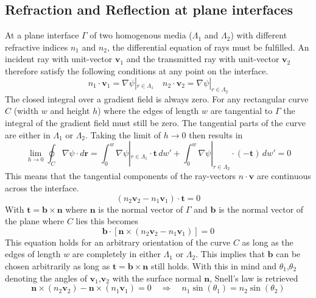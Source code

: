 \subsection{Refraction and Reflection at plane interfaces}
At a plane interface \(\Gamma \) of two homogenous media (\(\Lambda_1\) and \(\Lambda_2\)) with different refractive indices \(n_1\) and \(n_2\), the differential equation of rays must be fulfilled.
An incident ray with unit-vector \(\mathbf{v}_1\) and the transmitted ray with unit-vector \(\mathbf{v}_2\) therefore satisfy the following conditions at any point on the interface.
\begin{equation}
    n_1 \cdot \mathbf{v}_1 = \nabla \psi|_{r \in \Lambda_1 } \quad n_2 \cdot \mathbf{v}_2 = \nabla \psi|_{r \in \Lambda_2 } 
\end{equation}
The closed integral over a gradient field is always zero.
For any rectangular curve \(C\) (width \(w\) and height \(h\)) where the edges of length \(w\) are tangential to \(\Gamma \) the integral of the gradient field must still be zero.
The tangential parts of the curve are either in \(\Lambda_1\) or \(\Lambda_2\).
Taking the limit of \(h \to 0\) then results in~\parencite{born_foundations_1999}
\begin{equation}
    \lim_{h \to 0} \oint_C \nabla \psi \cdot d\mathbf{r} = \int_{0}^{w} \nabla \psi|_{r \in \Lambda_1 } \cdot \mathbf{t} \, dw' + \int_{0}^{w} \nabla \psi|_{r \in \Lambda_2 } \cdot (-\mathbf{t}) \, dw' = 0
\end{equation}
This means that the tangential components of the ray-vectors \(n \cdot \mathbf{v}\) are continuous across the interface.
\begin{equation}
    (n_2 \mathbf{v}_2 - n_1 \mathbf{v}_1) \cdot \mathbf{t} = 0
\end{equation}
With \(\mathbf{t} = \mathbf{b} \times \mathbf{n}\) where \(\mathbf{n}\) is the normal vector of \(\Gamma \) and \(\mathbf{b}\) is the normal vector of the plane where \(C\) lies this becomes
\begin{equation}
    \mathbf{b} \cdot [\mathbf{n} \times (n_2 \mathbf{v}_2 - n_1 \mathbf{v}_1)] = 0
\end{equation}
This equation holds for an arbitrary orientation of the curve \(C\) as long as the edges of length \(w\) are completely in either \(\Lambda_1\) or \(\Lambda_2\).
This implies that \(\mathbf{b}\) can be chosen arbitrarily as long as \(\mathbf{t} = \mathbf{b} \times \mathbf{n}\) still holds.
With this in mind and \(\theta_1\),\(\theta_2\) denoting the angles of \(\mathbf{v}_1\),\(\mathbf{v}_2\) with the surface normal \(\mathbf{n}\), Snell's law is retrieved
\begin{equation}
    \mathbf{n} \times (n_2\mathbf{v}_2) - \mathbf{n} \times (n_1\mathbf{v}_1) = 0 \quad \Rightarrow \quad n_1 \sin(\theta_1) = n_2 \sin(\theta_2)
\end{equation}

